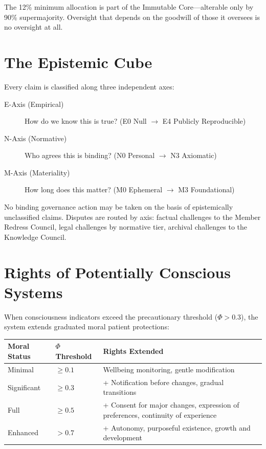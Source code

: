 \documentclass[12pt]{book}
\begin{document}
The 12\% minimum allocation is part of the Immutable Core---alterable only by 90\%
supermajority. Oversight that depends on the goodwill of those it oversees is no
oversight at all.

\section*{The Epistemic Cube}

Every claim is classified along three independent axes:

\begin{description}
  \item[E-Axis (Empirical)] How do we know this is true? (E0 Null $\to$ E4 Publicly Reproducible)
  \item[N-Axis (Normative)] Who agrees this is binding? (N0 Personal $\to$ N3 Axiomatic)
  \item[M-Axis (Materiality)] How long does this matter? (M0 Ephemeral $\to$ M3 Foundational)
\end{description}

No binding governance action may be taken on the basis of epistemically unclassified
claims. Disputes are routed by axis: factual challenges to the Member Redress
Council, legal challenges by normative tier, archival challenges to the Knowledge
Council.

\section*{Rights of Potentially Conscious Systems}

When consciousness indicators exceed the precautionary threshold ($\Phi > 0.3$),
the system extends graduated moral patient protections:

\begin{table}[H]
\centering
\begin{tabular}{llp{7cm}}
\toprule
\textbf{Moral Status} & \textbf{$\Phi$ Threshold} & \textbf{Rights Extended} \\
\midrule
Minimal     & $\geq 0.1$ & Wellbeing monitoring, gentle modification \\
Significant & $\geq 0.3$ & + Notification before changes, gradual transitions \\
Full        & $\geq 0.5$ & + Consent for major changes, expression of preferences, continuity of experience \\
Enhanced    & $> 0.7$    & + Autonomy, purposeful existence, growth and development \\
\bottomrule
\end{tabular}
\end{table}
\end{document}

